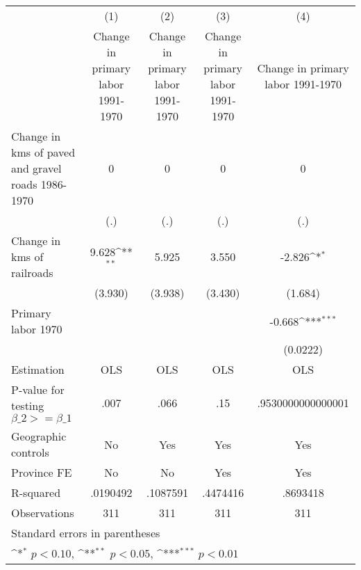 {
\def\sym#1{\ifmmode^{#1}\else\(^{#1}\)\fi}
\begin{tabular}{l*{4}{c}}
\hline\hline
                    &\multicolumn{1}{c}{(1)}&\multicolumn{1}{c}{(2)}&\multicolumn{1}{c}{(3)}&\multicolumn{1}{c}{(4)}\\
                    &\multicolumn{1}{c}{Change in primary labor 1991-1970}&\multicolumn{1}{c}{Change in primary labor 1991-1970}&\multicolumn{1}{c}{Change in primary labor 1991-1970}&\multicolumn{1}{c}{Change in primary labor 1991-1970}\\
\hline
Change in kms of paved and gravel roads 1986-1970&           0         &           0         &           0         &           0         \\
                    &         (.)         &         (.)         &         (.)         &         (.)         \\
[1em]
Change in kms of railroads&       9.628\sym{**} &       5.925         &       3.550         &      -2.826\sym{*}  \\
                    &     (3.930)         &     (3.938)         &     (3.430)         &     (1.684)         \\
[1em]
Primary labor 1970  &                     &                     &                     &      -0.668\sym{***}\\
                    &                     &                     &                     &    (0.0222)         \\
\hline
Estimation          &         OLS         &         OLS         &         OLS         &         OLS         \\
P-value for testing $\beta\_2 >= \beta\_1$&        .007         &        .066         &         .15         &.9530000000000001         \\
Geographic controls &          No         &         Yes         &         Yes         &         Yes         \\
Province FE         &          No         &          No         &         Yes         &         Yes         \\
R-squared           &    .0190492         &    .1087591         &    .4474416         &    .8693418         \\
Observations        &         311         &         311         &         311         &         311         \\
\hline\hline
\multicolumn{5}{l}{\footnotesize Standard errors in parentheses}\\
\multicolumn{5}{l}{\footnotesize \sym{*} \(p<0.10\), \sym{**} \(p<0.05\), \sym{***} \(p<0.01\)}\\
\end{tabular}
}
